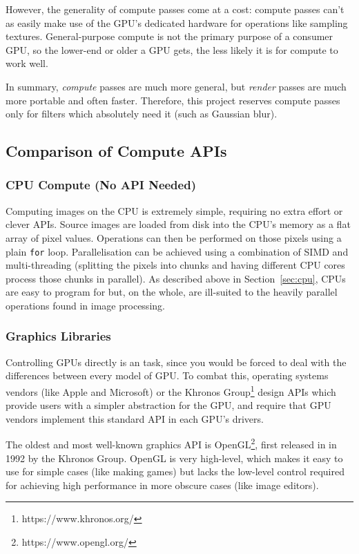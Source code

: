 \documentclass[12pt]{article}
\begin{document}
However, the generality of compute passes come at a cost: compute passes can't as easily make use of
the GPU's dedicated hardware for operations like sampling textures.  General-purpose compute is not
the primary purpose of a consumer GPU, so the lower-end or older a GPU gets, the less likely it is
for compute to work well.

In summary, \emph{compute} passes are much more general, but \emph{render} passes are much more
portable and often faster.  Therefore, this project reserves compute passes only for filters which
absolutely need it (such as Gaussian blur).

\subsection{Comparison of Compute APIs}

\subsubsection{CPU Compute (No API Needed)}

Computing images on the CPU is extremely simple, requiring no extra effort or clever APIs.  Source
images are loaded from disk into the CPU's memory as a flat array of pixel values.  Operations can
then be performed on those pixels using a plain \verb|for| loop.  Parallelisation can be achieved
using a combination of SIMD and multi-threading (splitting the pixels into chunks and having
different CPU cores process those chunks in parallel).  As described above in Section~\ref{sec:cpu},
CPUs are easy to program for but, on the whole, are ill-suited to the heavily parallel operations
found in image processing.

\subsubsection{Graphics Libraries}

Controlling GPUs directly is an task, since you would be forced to deal with the differences between
every model of GPU.  To combat this, operating systems vendors (like Apple and Microsoft) or the
Khronos Group\footnote{https://www.khronos.org/} design APIs which provide users with a simpler
abstraction for the GPU, and require that GPU vendors implement this standard API in each GPU's
drivers.

The oldest and most well-known graphics API is OpenGL\footnote{https://www.opengl.org/}, first
released in in 1992 by the Khronos Group.  OpenGL is very high-level, which makes it easy to use for
simple cases (like making games) but lacks the low-level control required for achieving high
performance in more obscure cases (like image editors).
\end{document}
